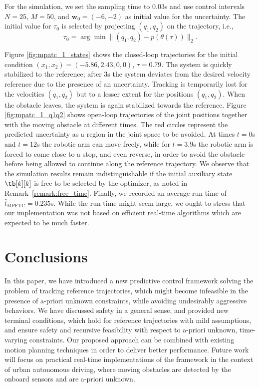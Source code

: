 \documentclass[journal]{IEEEtran}
\newcommand{\w}{{\mathbf{w}}}
\newcommand{\review}[1]{#1}
\begin{document}
	For the simulation, we set the sampling time to $0.03$s and use control intervals $N=25$, $M=50$, and $\w_0=(-6,-2)$ as initial value for the uncertainty. The initial value for $\tau_0$ is selected by projecting $(q_1,q_2)$ on the trajectory, i.e., $$\tau_0=\arg\min\|(q_1,q_2)-p(\theta(\tau))\|_2.$$ 
	
	
	Figure \ref{fig:mpatc_1_states} shows the closed-loop trajectories for the initial condition $(x_1,x_2)=(-5.86,2.43,0,0)$, $\tau=0.79$. The system is quickly stabilized to the reference; after $3$s the system deviates from the desired velocity reference due to the presence of an uncertainty. Tracking is temporarily lost for the velocities $(\dot{q}_1,\dot{q}_2)$ but to a lesser extent for the positions $(q_1,q_2)$. When the obstacle leaves, the system is again stabilized towards the reference. Figure \ref{fig:mpatc_1_q1q2} shows open-loop trajectories of the joint positions together with the moving obstacle at different times. The red circles represent the predicted uncertainty as a region in the joint space to be avoided. At times $t=0$s and $t=12$s the robotic arm can move freely, while for $t=3.9$s the robotic arm is forced to come close to a stop, and even reverse, in order to avoid the obstacle before being allowed to continue along the reference trajectory. \review{We observe that the simulation results remain indistinguishable if the initial auxiliary state $\tb[k][k]$ is free to be selected by the optimizer, as noted in Remark~\ref{remark:free_time}.} Finally, we recorded an average run time of $\hat{t}_\mathrm{MPFTC}=0.235$s. While the run time might seem large, we ought to stress that our implementation was not based on efficient real-time algorithms which are expected to be much faster.
	
	\section{Conclusions}\label{sec:conclusions}
	In this paper, we have introduced a new predictive control framework solving the problem of tracking reference trajectories, which might become infeasible in the presence of a-priori unknown constraints, while avoiding undesirably aggressive behaviors. We have discussed safety in a general sense, and provided new terminal conditions, which hold for reference trajectories with mild assumptions, and ensure safety and recursive feasibility with respect to a-priori unknown, time-varying constraints. Our proposed approach can be combined with existing motion planning techniques in order to deliver better performance. Future work will focus on practical real-time implementations of the framework in the context of urban autonomous driving, where moving obstacles are detected by the onboard sensors and are a-priori unknown. 
	
\end{document}
